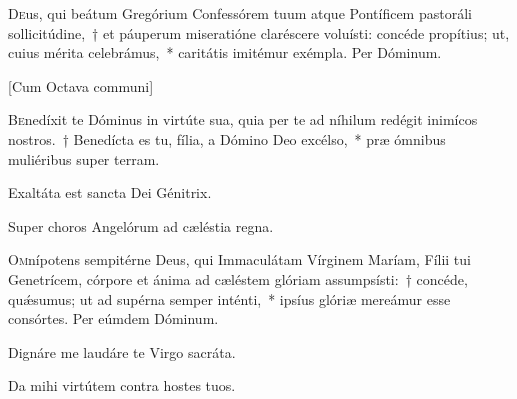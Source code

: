 \documentclass[vesperale_romanum.tex]{subfiles}
\begin{document}
 
 \oratio
\lettrine{D}{e}us, qui beátum Gregórium Confessórem tuum atque Pontíficem pastoráli sollicitúdine,~† et páuperum miseratióne claréscere voluísti: concéde propítius; ut, cuius mérita celebrámus,~* caritátis imitémur exémpla.
Per Dóminum.

\newpage
{}

[Cum Octava communi]



\lettrine{B}{e}nedíxit te Dóminus in virtúte sua, quia per te ad níhilum redégit inimícos nostros.~† Benedícta es tu, fília, a Dómino Deo excélso,~* præ ómnibus muliéribus super terram.


\hymnus


\vv Exaltáta est sancta Dei Génitrix.

\rr Super choros Angelórum ad cæléstia regna.

\oratio

\lettrine{O}{m}nípotens sempitérne Deus, qui Immaculátam Vírginem Maríam, Fílii tui Genetrícem, córpore et ánima ad cæléstem glóriam assumpsísti:~† concéde, quǽsumus; ut ad supérna semper inténti,~* ipsíus glóriæ mereámur esse consórtes. Per eúmdem Dóminum.
 


 


\vv Dignáre me laudáre te Virgo sacráta. %

\rr Da mihi virtútem contra hostes tuos.

\end{document}
